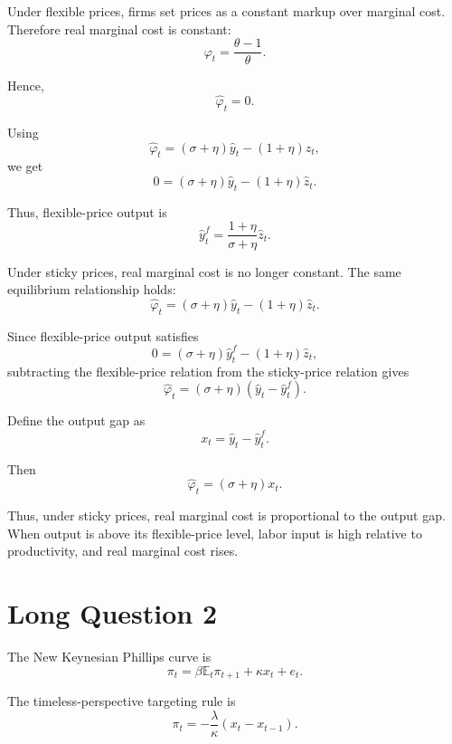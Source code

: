 \documentclass[12pt]{article}
\begin{document}
Under flexible prices, firms set prices as a constant markup over marginal cost. Therefore real marginal cost is constant:
\[
\varphi_t=\frac{\theta-1}{\theta}.
\]

Hence,
\[
\hat{\varphi}_t=0.
\]

Using
\[
\hat{\varphi}_t
=
(\sigma+\eta)\hat{y}_t
-
(1+\eta)\hat{z}_t,
\]
we get
\[
0
=
(\sigma+\eta)\hat{y}_t
-
(1+\eta)\hat{z}_t.
\]

Thus, flexible-price output is
\[
\boxed{
\hat{y}_t^f
=
\frac{1+\eta}{\sigma+\eta}\hat{z}_t.
}
\]

Under sticky prices, real marginal cost is no longer constant. The same equilibrium relationship holds:
\[
\boxed{
\hat{\varphi}_t
=
(\sigma+\eta)\hat{y}_t
-
(1+\eta)\hat{z}_t.
}
\]

Since flexible-price output satisfies
\[
0
=
(\sigma+\eta)\hat{y}_t^f
-
(1+\eta)\hat{z}_t,
\]
subtracting the flexible-price relation from the sticky-price relation gives
\[
\hat{\varphi}_t
=
(\sigma+\eta)(\hat{y}_t-\hat{y}_t^f).
\]

Define the output gap as
\[
x_t=\hat{y}_t-\hat{y}_t^f.
\]

Then
\[
\boxed{
\hat{\varphi}_t
=
(\sigma+\eta)x_t.
}
\]

Thus, under sticky prices, real marginal cost is proportional to the output gap. When output is above its flexible-price level, labor input is high relative to productivity, and real marginal cost rises.









\newpage
\section*{Long Question 2}

The New Keynesian Phillips curve is
\[
\pi_t=\beta\mathbb{E}_t\pi_{t+1}+\kappa x_t+e_t.
\]

The timeless-perspective targeting rule is
\[
\pi_t=-\frac{\lambda}{\kappa}(x_t-x_{t-1}).
\]
\end{document}
